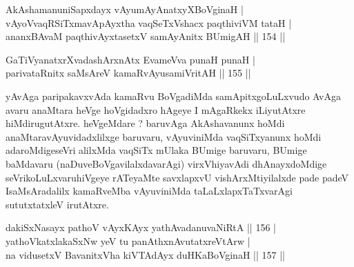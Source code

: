 \begin{shl}
AkAshamanuniSapxdayx vAyumAyAnatxyX\footnotemark[2]BoVginaH | \\
vAyoVvaqRSiTxmavApAyxtha vaqSeTxVshacx paqthiviVM tataH | \\
ananxBAvaM paqthivAyx\s tasetxV samAyAnitx BUmigAH \hfill|| 154 || 
\end{shl}

\begin{shl}
GaTiVyanatxrXvadashArxnAtx EvameVva punaH punaH | \\
parivataRnitx saMsAreV kamaRvAyusamiVritAH \hfill|| 155 || 
\end{shl}

\begin{artha}
yAvAga paripakavxvAda kamaRvu BoVgadiMda samApitxgoLuLxvudo AvAga avaru anaMtara heVge hoVgidadxro hAgeye I mAgaRkekx iLiyutAtxre hiMdirugutAtxre. heVgeMdare ? baruvAga AkAshavanunx hoMdi anaMtaravAyuvidadxlilxge baruvaru, vAyuviniMda vaqSiTxyanunx hoMdi adaroMdigeseVri alilxMda vaqSiTx mUlaka BUmige baruvaru, BUmige baMdavaru (naDuveBoVgavilalxdavarAgi) virxVhiyavAdi dhAnayxdoMdige seVrikoLuLxvaruhiVgeye rATeyaMte savxlapxvU  vishArxMtiyilalxde pade padeV IsaMsAradalilx kamaRveMba vAyuviniMda taLaLxlapxTaTxvarAgi sututxtatxleV irutAtxre.
\end{artha}


\begin{shl}
dakiSxNasayx pathoV vAyxKAyx yathAvadanuvaNiRtA \hfill|| 156 | \\
yathoVkatxlakaSxNw yeV tu panAthxnAvutatxreVtArw | \\
na vidusetxV BavanitxVha kiVTAdAyx duHKaBoVginaH \hfill|| 157 || 
\end{shl}

